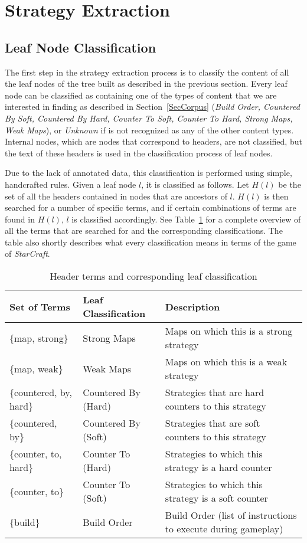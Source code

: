\documentclass[]{article}
\newcommand{\refsection}[1]{Section~\ref{#1}}
\newcommand{\reftable}[1]{Table~\ref{#1}}
\begin{document}
\section{Strategy Extraction} \label{SecStrategyExtraction}
\subsection{Leaf Node Classification}
The first step in the strategy extraction process is to classify the content of all the leaf nodes of the tree built as described in the previous section. Every leaf node can be classified as containing one of the types of content that we are interested in finding as described in \refsection{SecCorpus} (\emph{Build Order, Countered By Soft, Countered By Hard, Counter To Soft, Counter To Hard, Strong Maps, Weak Maps}), or \emph{Unknown} if is not recognized as any of the other content types. Internal nodes, which are nodes that correspond to headers, are not classified, but the text of these headers is used in the classification process of leaf nodes.

Due to the lack of annotated data, this classification is performed using simple, handcrafted rules. Given a leaf node $l$, it is classified as follows. Let $H(l)$ be the set of all the headers contained in nodes that are ancestors of $l$. $H(l)$ is then searched for a number of specific terms, and if certain combinations of terms are found in $H(l)$, $l$ is classified accordingly. See  \reftable{TableLeafClassification} for a complete overview of all the terms that are searched for and the corresponding classifications. The table also shortly describes what every classification means in terms of the game of \emph{StarCraft}.
\begin{table}
\caption{Header terms and corresponding leaf classification} \label{TableLeafClassification}
\begin{tabularx}{\textwidth}{ |X|X|X| }
  \hline
  {\bf Set of Terms} 		& {\bf Leaf Classification}	& {\bf Description}\\
  \hline
  \{map, strong\}  			& Strong Maps					& Maps on which this is a strong strategy\\
  \hline
  \{map, weak\}  				& Weak Maps						& Maps on which this is a weak strategy\\
  \hline
  \{countered, by, hard\}  	& Countered By (Hard)			& Strategies that are hard counters to this strategy\\
  \hline
  \{countered, by\}  			& Countered By (Soft)			& Strategies that are soft counters to this strategy\\
  \hline
  \{counter, to, hard\}  		& Counter To (Hard)				& Strategies to which this strategy is a hard counter\\
  \hline
  \{counter, to\}  			& Counter To (Soft)				& Strategies to which this strategy is a soft counter\\
  \hline
  \{build\}  					& Build Order					& Build Order (list of instructions to execute during gameplay)\\
  \hline
\end{tabularx}
\end{table}
\end{document}
